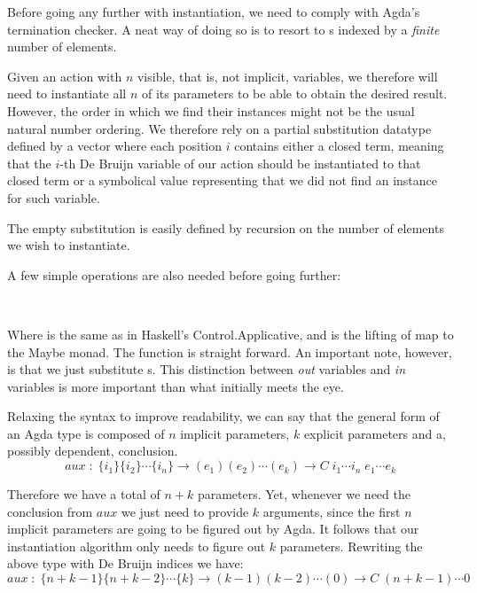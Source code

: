 Before going any further with instantiation, we need to comply with Agda's termination checker.
A neat way of doing so is to resort to s indexed by a \emph{finite} number of elements.


Given an action with $n$ visible, that is, not implicit, variables, we therefore will need to instantiate all $n$ of its parameters to be able to
obtain the desired result. However, the order in which we find their instances
might not be the usual natural number ordering. We therefore rely on a
partial substitution datatype defined by a vector where each position $i$ contains
either a closed term, meaning that the $i$-th De Bruijn variable of our action should be instantiated to that closed term or a symbolical value representing that we did not find an instance for such variable.


The empty substitution is easily defined by recursion on the number of elements we wish to instantiate.


A few simple operations are also needed before going further:

\\

Where \F{$\_<\$>\_$} is the same as in Haskell's Control.Applicative, and  is the lifting of map to the Maybe monad. The  function is straight forward. An important note, however, is that we just substitute s. This distinction between \emph{out} variables and \emph{in} variables is more important than what initially meets the eye. 

Relaxing the syntax to improve readability, we can say that the general form of an Agda type is composed of $n$ implicit parameters, $k$ explicit parameters and a, possibly dependent, conclusion.
\[
aux\;:\;\{ i_1 \}\{ i_2 \} \cdots \{ i_n \} \rightarrow ( e_1 )( e_2) \cdots (e_k) \rightarrow C\;i_1\cdots i_n\;e_1\cdots e_k
\]

Therefore we have a total of $n+k$ parameters. Yet, whenever we need the conclusion from $aux$ we just need to provide $k$ arguments, since the first
$n$ implicit parameters are going to be figured out by Agda. It follows that our instantiation algorithm only needs to figure out $k$ parameters. Rewriting the above type with De Bruijn indices we have:
\[
aux\;:\;\{ n+k - 1 \}\{ n+k - 2\} \cdots \{ k \} \rightarrow (k-1)(k-2) \cdots (0) \rightarrow C\;(n+k - 1) \cdots 0
\]

